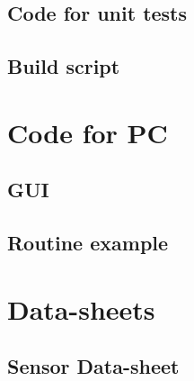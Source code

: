 \documentclass[12pt,a4paper, twoside]{article}
\begin{document}
\subsection{Code for unit tests}








\subsection{Build script}


\section{Code for PC}
\subsection{GUI}

\subsection{Routine example}

\section{Data-sheets}
\subsection{Sensor Data-sheet }\label{app:PMW3660}

%
\end{document}
